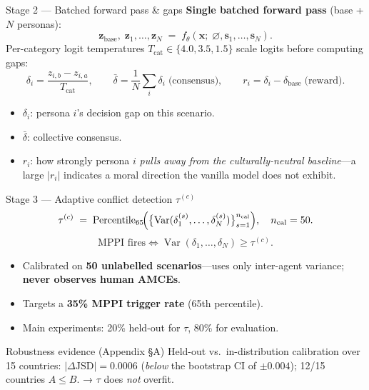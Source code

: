 \documentclass[10pt,aspectratio=169]{beamer}
\begin{document}
\begin{frame}{Stage 2 — Batched forward pass \& gaps}
  \textbf{Single batched forward pass} (base + $N$ personas):
  \[
    \mathbf{z}_\text{base},\;\mathbf{z}_1,\ldots,\mathbf{z}_N
    \;=\; f_\theta\!\left(\mathbf{x};\;\varnothing,\mathbf{s}_1,\ldots,\mathbf{s}_N\right).
  \]
  Per-category logit temperatures $T_\text{cat}\in\{4.0, 3.5, 1.5\}$ scale logits before computing gaps:
  \[
    \delta_i = \frac{z_{i,b}-z_{i,a}}{T_\text{cat}}, \qquad
    \bar{\delta} = \frac{1}{N}\sum_i \delta_i \;\text{(consensus)},\qquad
    r_i = \delta_i - \delta_\text{base}\;\text{(reward).}
  \]
  \begin{itemize}
    \item $\delta_i$: persona $i$'s decision gap on this scenario.
    \item $\bar{\delta}$: collective consensus.
    \item $r_i$: how strongly persona $i$ \emph{pulls away from the culturally-neutral baseline}---a large $|r_i|$ indicates a moral direction the vanilla model does not exhibit.
  \end{itemize}
\end{frame}

\begin{frame}{Stage 3 — Adaptive conflict detection $\tau^{(c)}$}
  \[
    \tau^{(c)} \;=\; \operatorname{Percentile}_{65}\!
    \Bigl(\bigl\{\operatorname{Var}(\delta_1^{(s)},\ldots,\delta_N^{(s)})\bigr\}_{s=1}^{n_\text{cal}}\Bigr),
    \quad n_\text{cal}=50.
  \]
  \[
    \text{MPPI fires} \iff \operatorname{Var}(\delta_1,\ldots,\delta_N) \ge \tau^{(c)}.
  \]
  \begin{itemize}
    \item Calibrated on \textbf{50 unlabelled scenarios}---uses only inter-agent variance; \textbf{never observes human AMCEs}.
    \item Targets a \textbf{35\% MPPI trigger rate} (65th percentile).
    \item Main experiments: 20\% held-out for $\tau$, 80\% for evaluation.
  \end{itemize}
  \begin{block}{Robustness evidence (Appendix \S A)}
    Held-out vs.\ in-distribution calibration over 15 countries: $|\Delta\text{JSD}| = \mathbf{0.0006}$
    (\emph{below} the bootstrap CI of $\pm 0.004$); 12/15 countries $A\le B$. → $\tau$ does \emph{not} overfit.
  \end{block}
\end{frame}
\end{document}
